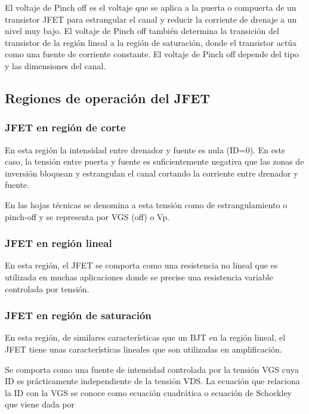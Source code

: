 \documentclass[12pt, a4paper]{article}
\begin{document}
    El voltaje de Pinch off es el voltaje que se aplica a la puerta o compuerta de un transistor JFET para estrangular el canal y reducir la corriente de drenaje a un nivel muy bajo. El voltaje de Pinch off también determina la transición del transistor de la región lineal a la región de saturación, donde el transistor actúa como una fuente de corriente constante. El voltaje de Pinch off depende del tipo y las dimensiones del canal.

    \subsection{Regiones de operación del JFET}

    \subsubsection{JFET en región de corte}

    En esta región la intensidad entre drenador y fuente es nula (ID=0). En este caso, la tensión entre puerta y fuente es suficientemente negativa que las zonas de inversión bloquean y estrangulan el canal cortando la corriente entre drenador y fuente.

    En las hojas técnicas se denomina a esta tensión como de estrangulamiento o pinch-off y se representa por VGS (off) o Vp.

    \subsubsection{JFET en región lineal}

    En esta región, el JFET se comporta como una resistencia no lineal que es utilizada en muchas aplicaciones donde se precise una resistencia variable controlada por tensión.

    \subsubsection{JFET en región de saturación}

    En esta región, de similares características que un BJT en la región lineal, el JFET tiene unas características lineales que son utilizadas en amplificación.

    Se comporta como una fuente de intensidad controlada por la tensión VGS cuya ID es prácticamente independiente de la tensión VDS. La ecuación que relaciona la ID con la VGS se conoce como ecuación cuadrática o ecuación de Schockley que viene dada por
\end{document}
